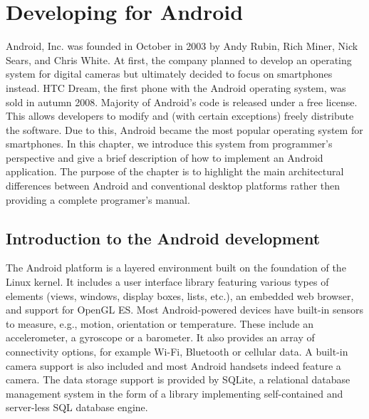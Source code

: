 \chapter{Developing for Android}
\label{chap:android}

Android, Inc\@. was founded in October in 2003 by Andy Rubin, Rich Miner, Nick Sears, and Chris White. 
At first, the company planned to develop an operating system for digital cameras %
but ultimately %
decided to focus on smartphones instead. %
HTC Dream, the first phone with the Android operating system, was sold in autumn 2008.
Majority of Android's code is released under a free license. 
This allows developers to modify and (with certain exceptions) freely distribute the software.
Due to this, Android became the most popular operating system for smartphones.
In this chapter, we introduce this system from programmer's perspective and give a brief description of how to implement an Android application.
The purpose of the chapter is to highlight the main architectural differences between Android and conventional desktop platforms rather then providing a complete programer's manual. 

\section{Introduction to the Android development}

The Android platform is a layered environment built on the foundation of the Linux kernel.
It includes a user interface library featuring various types of elements (views, windows, display boxes, lists, etc.),  
an embedded web browser, and support for OpenGL ES.
Most Android-powered devices have built-in sensors to measure, e.g., motion, orientation or temperature. 
These include an accelerometer, a gyroscope or a barometer.
It also provides an array of connectivity options, for example Wi-Fi, Bluetooth or cellular data.
A built-in camera support is also included and most Android handsets indeed feature a camera. 
The data storage support is provided by SQLite, a relational database management system in the form of a library implementing self-contained and server-less SQL database engine.
 
